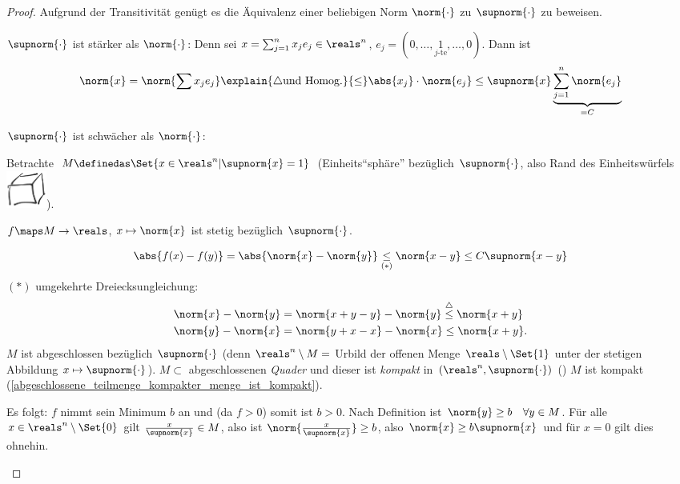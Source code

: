 \begin{proof}
    Aufgrund der Transitivität genügt es die Äquivalenz einer beliebigen Norm \( \norm{\cdot} \) zu \( \supnorm{\cdot} \) zu beweisen.
    \begin{proofenumerate}
        \item \( \supnorm{\cdot} \) ist stärker als \( \norm{\cdot} \):
        Denn sei \( x=\sum_{j=1}^{n}x_j e_j\in \reals^n  \), \( e_j=(0,\dotsc, \underset{j \text{-te}}{1},\dotsc,0) \). Dann ist
        \begin{align*}
            \norm{x}=\norm{\sum x_j e_j}\explain{\triangle \text{und Homog.}}{\leq}\abs{x_j}\cdot\norm{e_j}\leq \supnorm{x}\underbrace{\sum_{j=1}^{n}\norm{e_j}}_{=C}
        \end{align*}
        \item \( \supnorm{\cdot} \) ist schwächer als \( \norm{\cdot} \):
        
        Betrachte \( M\definedas \Set{x\in \reals^n|\supnorm{x}=1} \) (Einheits\enquote{sphäre} bezüglich \( \supnorm{\cdot} \), also Rand des Einheitswürfels \includegraphics[height=\baselineskip]{figures/einheitswuerfel_rand}).

        \begin{behauptung*}
            \( f\maps M\to \reals \), \( x\mapsto \norm{x} \) ist stetig bezüglich \( \supnorm{\cdot} \).
        \end{behauptung*}
        \begin{subproof}
            \begin{align*}
                \abs{f(x)-f(y)}=\abs{\norm{x}-\norm{y}}\underset{(*)}{\leq}\norm{x-y}\leq C\supnorm{x-y}
            \end{align*}
            \( (*) \) umgekehrte Dreiecksungleichung:
            \begin{align*}
                \norm{x}-\norm{y}&=\norm{x+y-y}-\norm{y}\overset{\triangle}{\leq}\norm{x+y}\\
                \norm{y}-\norm{x}&=\norm{y+x-x}-\norm{x}\leq \norm{x+y}.
            \end{align*}
        \( M \) ist abgeschlossen bezüglich \( \supnorm{\cdot} \) (denn \( \reals^n\setminus M= \) Urbild der offenen Menge \( \reals\setminus \Set{1} \) unter der stetigen Abbildung \( x\mapsto \supnorm{\cdot} \)). \( M\subset  \) abgeschlossenen \emph{Quader} und dieser ist \emph{kompakt} in \( (\reals^n,\supnorm{\cdot}) \) () \timplies \( M \) ist kompakt (\ref{abgeschlossene_teilmenge_kompakter_menge_ist_kompakt}).

        Es folgt: \( f \) nimmt sein Minimum \( b \) an und (da \( f>0 \)) somit ist \( b>0 \). Nach Definition ist \( \norm{y}\geq b\quad \forall y\in M \). Für alle \( x\in \reals^n\setminus\Set{0} \) gilt \( \frac{x}{\supnorm{x}}\in M \), also ist \( \norm{\frac{x}{\supnorm{x}}}\geq b \), also \( \norm{x}\geq b\supnorm{x} \) und für \( x=0 \) gilt dies ohnehin.
        \end{subproof}
    \end{proofenumerate}
\end{proof}
